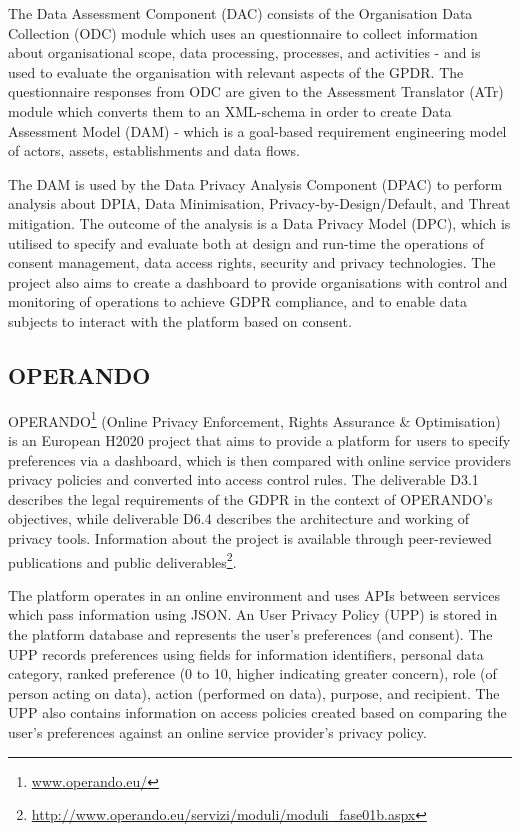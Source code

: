 The Data Assessment Component (DAC) consists of the Organisation Data Collection (ODC) module which uses an questionnaire to collect information about organisational scope, data processing, processes, and activities - and is used to evaluate the organisation with relevant aspects of the GPDR. The questionnaire responses from ODC are given to the Assessment Translator (ATr) module which converts them to an XML-schema in order to create Data Assessment Model (DAM) - which is a goal-based requirement engineering model of actors, assets, establishments and data flows.

The DAM is used by the Data Privacy Analysis Component (DPAC) to perform analysis about DPIA, Data Minimisation, Privacy-by-Design/Default, and Threat mitigation. The outcome of the analysis is a Data Privacy Model (DPC), which is utilised to specify and evaluate both at design and run-time the operations of consent management, data access rights, security and privacy technologies. The project also aims to create a dashboard to provide organisations with control and monitoring of operations to achieve GDPR compliance, and to enable data subjects to interact with the platform based on consent.

\subsection{OPERANDO}
OPERANDO\footnote{\url{www.operando.eu/}} (Online Privacy Enforcement, Rights Assurance \& Optimisation) is an European H2020 project that aims to provide a platform for users to specify preferences via a dashboard, which is then compared with online service providers privacy policies and converted into access control rules.
The deliverable D3.1 \cite{noauthor_d3.1-guidelinesonlegalaspectsv2.0_77_289.pdf_nodate} describes the legal requirements of the GDPR in the context of OPERANDO's objectives, while deliverable D6.4 \cite{noauthor_d6.4finalproductversionofprivacyenhancedtoolsv1.0_77_366.pdf_nodate} describes the architecture and working of privacy tools.
Information about the project is available through peer-reviewed publications and public deliverables\footnote{\url{http://www.operando.eu/servizi/moduli/moduli_fase01b.aspx}}.

The platform operates in an online environment and uses APIs between services which pass information using JSON. An User Privacy Policy (UPP) \cite{noauthor_d6.7finalproductversionofsecurityawaretoolsv1.0_77_378.pdf_nodate} is stored in the platform database and represents the user's preferences (and consent). The UPP records preferences using fields for information identifiers, personal data category, ranked preference (0 to 10, higher indicating greater concern), role (of person acting on data), action (performed on data), purpose, and recipient. The UPP also contains information on access policies created based on comparing the user's preferences against an online service provider's privacy policy. 

